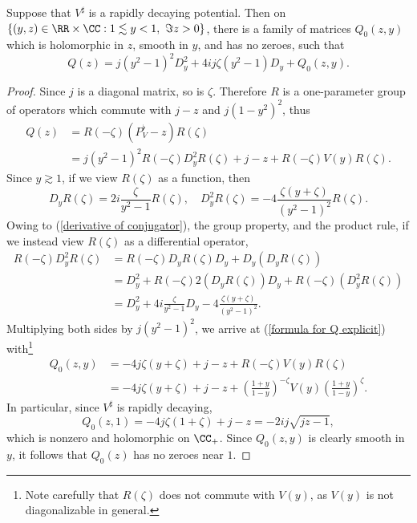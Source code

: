 \begin{lemma}
\label{formula for Q}
Suppose that $V^\sharp$ is a rapidly decaying potential.
Then on $\{(y, z) \in \RR \times \CC: 1 \lesssim y < 1,~\Im z > 0\}$, there is a family of matrices $Q_0(z, y)$ which is holomorphic in $z$, smooth in $y$, and has no zeroes, such that
\begin{equation}
\label{formula for Q explicit}
Q(z) = j(y^2 - 1)^2 D_y^2 + 4ij\zeta(y^2 - 1)D_y + Q_0(z, y).
\end{equation}
\end{lemma}
\begin{proof}
Since $j$ is a diagonal matrix, so is $\zeta$.
Therefore $R$ is a one-parameter group of operators which commute with $j - z$ and $j(1 - y^2)^2$, thus
\begin{align*}
Q(z) &= R(-\zeta) (P_V^\flat - z) R(\zeta)\\
&= j(y^2 - 1)^2 R(-\zeta)D_y^2R(\zeta) + j - z + R(-\zeta)V(y)R(\zeta).
\end{align*}
Since $y \gtrsim 1$, if we view $R(\zeta)$ as a function, then
\begin{equation}
\label{derivative of conjugator}
D_yR(\zeta) = 2i\frac{\zeta}{y^2 - 1} R(\zeta), \quad D_y^2 R(\zeta) = -4\frac{\zeta(y + \zeta)}{(y^2 - 1)^2} R(\zeta).
\end{equation}
Owing to (\ref{derivative of conjugator}), the group property, and the product rule, if we instead view $R(\zeta)$ as a differential operator,
\begin{align*}
R(-\zeta) D_y^2 R(\zeta) &= R(-\zeta) D_yR(\zeta)D_y + D_y(D_y R(\zeta))\\
&= D_y^2 + R(-\zeta) 2(D_y R(\zeta)) D_y + R(-\zeta) (D_y^2 R(\zeta))\\
&= D_y^2 + 4i\frac{\zeta}{y^2 - 1} D_y - 4\frac{\zeta(y + \zeta)}{(y^2 - 1)^2}.
\end{align*}
Multiplying both sides by $j(y^2 - 1)^2$, we arrive at (\ref{formula for Q explicit}) with\footnote{Note carefully that $R(\zeta)$ does not commute with $V(y)$, as $V(y)$ is not diagonalizable in general.}
\begin{align*}
Q_0(z, y) &= -4j\zeta(y + \zeta) +j - z + R(-\zeta)V(y)R(\zeta)\\
&=  -4j\zeta(y + \zeta) +j - z + \left(\frac{1 + y}{1 - y}\right)^{-\zeta} V(y) \left(\frac{1 + y}{1 - y}\right)^\zeta.
\end{align*}
In particular, since $V^\sharp$ is rapidly decaying,
$$Q_0(z, 1) = -4j\zeta(1 + \zeta) + j - z = -2ij\sqrt{jz - 1},$$
which is nonzero and holomorphic on $\CC_+$.
Since $Q_0(z, y)$ is clearly smooth in $y$, it follows that $Q_0(z)$ has no zeroes near $1$.
\end{proof}

